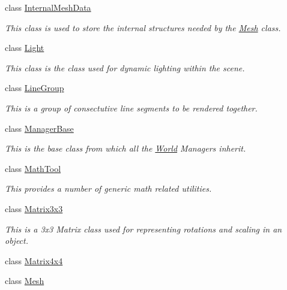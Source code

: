 \begin{DoxyCompactItemize}
class \hyperlink{classMezzanine_1_1InternalMeshData}{InternalMeshData}
\begin{DoxyCompactList}\small\item\em This class is used to store the internal structures needed by the \hyperlink{classMezzanine_1_1Mesh}{Mesh} class. \item\end{DoxyCompactList}\item 
class \hyperlink{classMezzanine_1_1Light}{Light}
\begin{DoxyCompactList}\small\item\em This class is the class used for dynamic lighting within the scene. \item\end{DoxyCompactList}\item 
class \hyperlink{classMezzanine_1_1LineGroup}{LineGroup}
\begin{DoxyCompactList}\small\item\em This is a group of consectutive line segments to be rendered together. \item\end{DoxyCompactList}\item 
class \hyperlink{classMezzanine_1_1ManagerBase}{ManagerBase}
\begin{DoxyCompactList}\small\item\em This is the base class from which all the \hyperlink{classMezzanine_1_1World}{World} Managers inherit. \item\end{DoxyCompactList}\item 
class \hyperlink{classMezzanine_1_1MathTool}{MathTool}
\begin{DoxyCompactList}\small\item\em This provides a number of generic math related utilities. \item\end{DoxyCompactList}\item 
class \hyperlink{classMezzanine_1_1Matrix3x3}{Matrix3x3}
\begin{DoxyCompactList}\small\item\em This is a 3x3 Matrix class used for representing rotations and scaling in an object. \item\end{DoxyCompactList}\item 
class \hyperlink{classMezzanine_1_1Matrix4x4}{Matrix4x4}
\item 
class \hyperlink{classMezzanine_1_1Mesh}{Mesh}

\end{DoxyCompactItemize}
